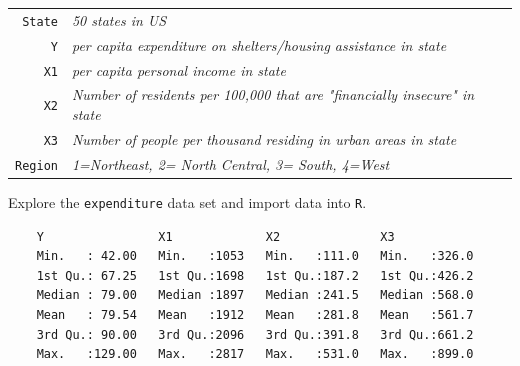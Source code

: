 \documentclass[12pt,letterpaper]{article}
\begin{document}
	
	\begin{tabular}{r|l}
		\texttt{State} &\emph{50 states in US} \\
		\texttt{Y} & \emph{per capita expenditure on shelters/housing assistance in state}\\
		\texttt{X1} &\emph{per capita personal income in state} \\
		\texttt{X2} &  \emph{Number of residents per 100,000 that are "financially insecure" in state}\\
		\texttt{X3} &  \emph{Number of people per thousand residing in urban areas in state} \\
		\texttt{Region} &  \emph{1=Northeast, 2= North Central, 3= South, 4=West} \\
	\end{tabular}
	
	\vspace{.5cm}
	\noindent Explore the \texttt{expenditure} data set and import data into \texttt{R}.
	\vspace{.5cm}
			
	
	\begin{Verbatim}
	Y                X1             X2              X3       
	Min.   : 42.00   Min.   :1053   Min.   :111.0   Min.   :326.0  
	1st Qu.: 67.25   1st Qu.:1698   1st Qu.:187.2   1st Qu.:426.2  
	Median : 79.00   Median :1897   Median :241.5   Median :568.0  
	Mean   : 79.54   Mean   :1912   Mean   :281.8   Mean   :561.7  
	3rd Qu.: 90.00   3rd Qu.:2096   3rd Qu.:391.8   3rd Qu.:661.2  
	Max.   :129.00   Max.   :2817   Max.   :531.0   Max.   :899.0     
	\end{Verbatim}
\end{document}
